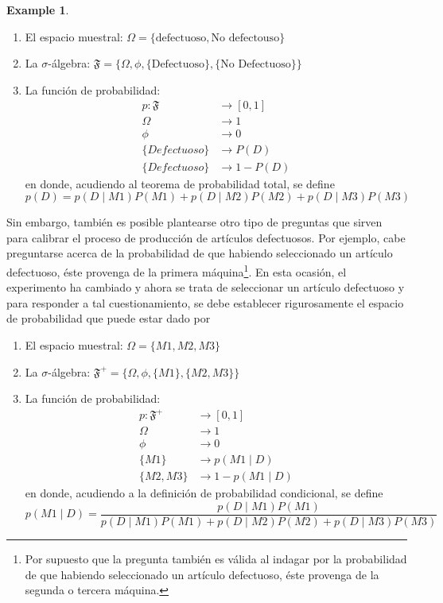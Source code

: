 \documentclass[
  spanish,
  letter]{book}
\providecommand{\tightlist}{%
  \setlength{\itemsep}{0pt}\setlength{\parskip}{0pt}}
\theoremstyle{definition}
\theoremstyle{definition}
\newtheorem{example}{Example}[chapter]
\theoremstyle{definition}
\theoremstyle{remark}
\begin{document}
\begin{example}
\begin{enumerate}
\def\labelenumi{\arabic{enumi}.}
\tightlist
\item
  El espacio muestral: \(\Omega=\{\text{defectuoso}, \text{No defectouso}\}\)
\item
  La \(\sigma\)-álgebra: \(\mathfrak{F}=\{\Omega, \phi, \{\text{Defectuoso}\}, \{\text{No Defectuoso}\}\}\)
\item
  La función de probabilidad:
  \begin{align*}
    p: \mathfrak{F} &\longrightarrow [0,1]\\
    \Omega &\longrightarrow 1\\
    \phi &\longrightarrow 0\\
    \{Defectuoso\}&\longrightarrow P(D)\\
    \{Defectuoso\}&\longrightarrow 1-P(D)
    \end{align*}
  en donde, acudiendo al teorema de probabilidad total, se define
  \begin{equation*}
    p(D)=p(D \mid M1)P(M1)+p(D \mid M2)P(M2)+p(D \mid M3)P(M3)
    \end{equation*}
\end{enumerate}

Sin embargo, también es posible plantearse otro tipo de preguntas que sirven para calibrar el proceso de producción de artículos defectuosos. Por ejemplo, cabe preguntarse acerca de la probabilidad de que habiendo seleccionado un artículo defectuoso, éste provenga de la primera máquina\footnote{Por supuesto que la pregunta también es válida al indagar por la probabilidad de que habiendo seleccionado un artículo defectuoso, éste provenga de la segunda o tercera máquina.}. En esta ocasión, el experimento ha cambiado y ahora se trata de seleccionar un artículo defectuoso y para responder a tal cuestionamiento, se debe establecer rigurosamente el espacio de probabilidad que puede estar dado por

\begin{enumerate}
\def\labelenumi{\arabic{enumi}.}
\tightlist
\item
  El espacio muestral: \(\Omega=\{M1, M2, M3 \}\)
\item
  La \(\sigma\)-álgebra: \(\mathfrak{F}^+=\{\Omega, \phi, \{M1\}, \{M2,M3\}\}\)
\item
  La función de probabilidad:
  \begin{align*}
    p: \mathfrak{F}^+ &\longrightarrow [0,1]\\
    \Omega &\longrightarrow 1\\
    \phi &\longrightarrow 0\\
    \{M1\}&\longrightarrow p(M1 \mid D)\\
    \{M2,M3\}&\longrightarrow 1-p(M1 \mid D)
    \end{align*}
  en donde, acudiendo a la definición de probabilidad condicional, se define
  \begin{equation*}
    p(M1 \mid D)=\frac{p(D \mid M1)P(M1)}{p(D \mid M1)P(M1)+p(D \mid M2)P(M2)+p(D \mid M3)P(M3)}
    \end{equation*}
\end{enumerate}


\end{example}
\end{document}
